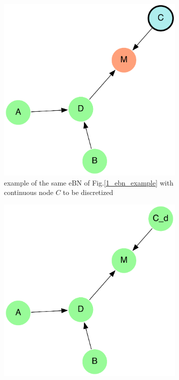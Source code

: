 \begin{figure}[h]
    \centering
    \begin{subfigure}{0.45\textwidth}
        \centering
        \includegraphics[width=\linewidth]{imgs/pdfs/3_d_ebn.pdf}
        \caption{example of the same eBN of Fig.\ref{1_ebn_example} with continuous node $C$ to be discretized}\label{1_ebn_disc_example}
    \end{subfigure}
    \hfill
    \begin{subfigure}{0.45\textwidth}
        \centering
        \includegraphics[width=\linewidth]{imgs/pdfs/4_d_rbn.pdf}

\end{subfigure}
\end{figure}
